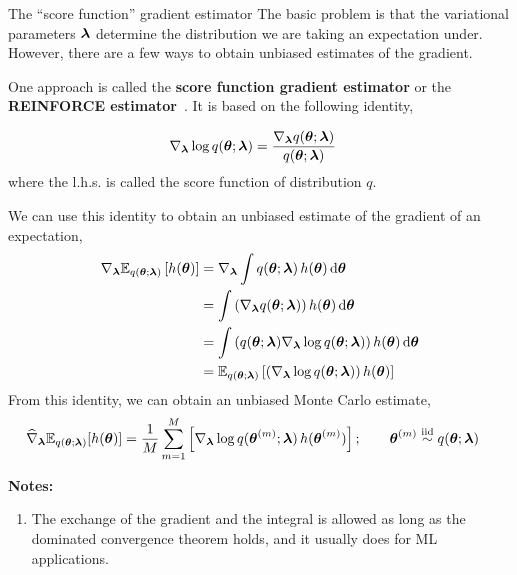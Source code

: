 \documentclass[aspectratio=169]{beamer}
\begin{document}
\begin{frame}[t, allowframebreaks]{The ``score function'' gradient estimator}
    The basic problem is that the variational parameters $\boldsymbol{\lambda}$ determine the distribution we are taking an expectation under.  However, there are a few ways to obtain unbiased estimates of the gradient.
    
    One approach is called the \textbf{score function gradient estimator} or the \textbf{REINFORCE estimator}~\citep{williams1992simple}. It is based on the following identity,
    
    \begin{align*}
        \nabla_{\boldsymbol{\lambda}} \log q(\boldsymbol{\theta}; \boldsymbol{\lambda}) &= \frac{\nabla_{\boldsymbol{\lambda}} q(\boldsymbol{\theta}; \boldsymbol{\lambda})}{q(\boldsymbol{\theta}; \boldsymbol{\lambda})}
    \end{align*}
    where the l.h.s. is called the score function of distribution $q$.
    
    We can use this identity to obtain an unbiased estimate of the gradient of an expectation,
    \begin{align*}
        \nabla_{\boldsymbol{\lambda}} \mathbb{E}_{q(\boldsymbol{\theta}; \boldsymbol{\lambda})} \left[ h(\boldsymbol{\theta}) \right] 
        &= \nabla_{\boldsymbol{\lambda}} \int q(\boldsymbol{\theta}; \boldsymbol{\lambda}) \, h(\boldsymbol{\theta}) \mathop{}\!\mathrm{d} \boldsymbol{\theta} \\
        &= \int \left(\nabla_{\boldsymbol{\lambda}} q(\boldsymbol{\theta}; \boldsymbol{\lambda})\right) h(\boldsymbol{\theta}) \mathop{}\!\mathrm{d} \boldsymbol{\theta} \\
        &= \int \left(q(\boldsymbol{\theta}; \boldsymbol{\lambda}) \nabla_{\boldsymbol{\lambda}} \log q(\boldsymbol{\theta}; \boldsymbol{\lambda})\right) h(\boldsymbol{\theta})  \mathop{}\!\mathrm{d} \boldsymbol{\theta} \\
        &= \mathbb{E}_{q(\boldsymbol{\theta}; \boldsymbol{\lambda})} \left[ \left(\nabla_{\boldsymbol{\lambda}} \log q(\boldsymbol{\theta}; \boldsymbol{\lambda})\right) h(\boldsymbol{\theta}) \right]
    \end{align*}
    From this identity, we can obtain an unbiased Monte Carlo estimate,
    \begin{align*}
        \widehat{\nabla}_{\boldsymbol{\lambda}} \mathbb{E}_{q(\boldsymbol{\theta}; \boldsymbol{\lambda})}[h(\boldsymbol{\theta})] &= \frac{1}{M} \sum_{m=1}^M \left[ \nabla_{\boldsymbol{\lambda}} \log q(\boldsymbol{\theta}^{(m)}; \boldsymbol{\lambda}) \, h(\boldsymbol{\theta}^{(m)}) \right]; 
        \qquad \boldsymbol{\theta}^{(m)} \stackrel{\text{iid}}{\sim} q(\boldsymbol{\theta}; \boldsymbol{\lambda})
    \end{align*}
    
    \textbf{Notes:}
    \begin{enumerate}
        \item The exchange of the gradient and the integral is allowed as long as the dominated convergence theorem holds, and it usually does for ML applications.
        

\end{enumerate}
\end{frame}
\end{document}

